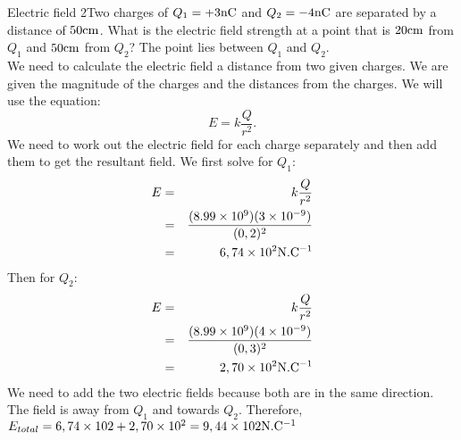 \begin{wex}{Electric field 2}{Two charges of $Q_1 = +3 {\rm {nC}}$ and  $Q_2 =
-4 {\rm {nC}}$ are separated by a distance of $50 {\rm {cm}}$. What is the electric
field strength at a point that is $20 {\rm {cm}}$ from  $Q_1$ and $50 {\rm {cm}}$
from $Q_2$? The point lies between $Q_1$ and $Q_2$.\\
}{
We need to calculate the electric field a distance from two given charges.
We are given the magnitude of the charges and
the distances from the charges.
 We will use the equation:
\begin{equation*}
E=k\frac{Q}{r^2}.
\end{equation*}
We need to work out the electric field for each charge separately and then add them to get the resultant field.
We first solve for $Q_1$:
\begin{eqnarray*}
E &=& k\frac{Q}{r^2}\\
&=& \frac {(8.99\times10^{9})(3 \times10^{-9})}{(0,2)^2}\\
&=& 6,74 \times10^{2} {\rm N.C^{-1}}\\
\end{eqnarray*}
Then for $Q_2$:
\begin{eqnarray*}
E &=& k\frac{Q}{r^2}\\
&=& \frac {(8.99\times10^{9})(4 \times10^{-9})}{(0,3)^2}\\
&=& 2,70 \times10^{2} {\rm N.C^{-1}}\\
\end{eqnarray*}
We need to add the two electric fields because both are in the same direction. The field is away from $Q_1$ and towards $Q_2$.
Therefore,
$E_{total} = 6,74 \times10{2} + 2,70 \times10^{2} = 9,44 \times10{2}
{\rm N.C^{-1}}$
}
\end{wex}

